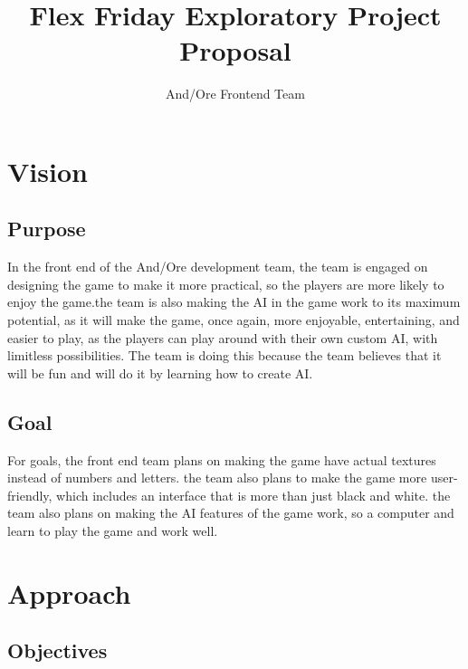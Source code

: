 \documentclass[11pt]{article}
\title{\textbf{{\color{blue}Flex Friday Exploratory Project Proposal}}}
\author{And/Ore Frontend Team}
\date{}
\begin{document}
\maketitle

\section{{\color{blue}Vision}}

\subsection{{\color{blue}Purpose}}

In the front end of the And/Ore development team, the team is engaged on designing the game to make it more practical, so the players are more likely to enjoy the game.the team is also making the AI in the game work to its maximum potential, as it will make the game, once again, more enjoyable, entertaining, and easier to play, as the players can play around with their own custom AI, with limitless possibilities. The team is doing this because the team believes that it will be fun and will do it by learning how to create AI.

\subsection{{\color{blue}Goal}}

For goals, the front end team plans on making the game have actual textures instead of numbers and letters. the team also plans to make the game more user-friendly, which includes an interface that is more than just black and white. the team also plans on making the AI features of the game work, so a computer and learn to play the game and work well.

\section{{\color{blue}Approach}}


\subsection{{\color{blue}Objectives}}
\end{document}
